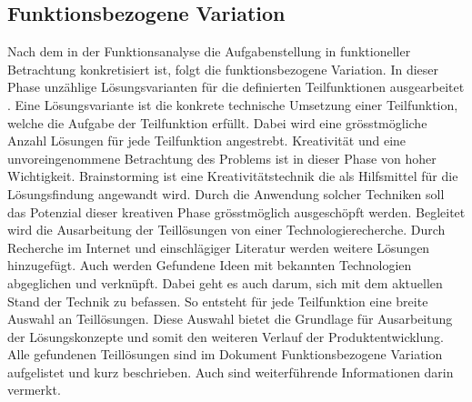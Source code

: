 \subsection{Funktionsbezogene Variation}
Nach dem in der Funktionsanalyse die Aufgabenstellung in funktioneller Betrachtung konkretisiert ist, folgt die funktionsbezogene Variation. In dieser Phase unzählige Lösungsvarianten für die definierten Teilfunktionen ausgearbeitet \cite{pahl}. Eine Lösungsvariante ist die konkrete technische Umsetzung einer Teilfunktion, welche die Aufgabe der Teilfunktion erfüllt. Dabei wird eine grösstmögliche Anzahl Lösungen für jede Teilfunktion angestrebt. 
\newline
Kreativität und eine unvoreingenommene Betrachtung des Problems ist in dieser Phase von hoher Wichtigkeit. Brainstorming ist eine Kreativitätstechnik die als Hilfsmittel für die Lösungsfindung angewandt wird. Durch die Anwendung solcher Techniken soll das Potenzial dieser kreativen Phase grösstmöglich ausgeschöpft werden.
\newline
Begleitet wird die Ausarbeitung der Teillösungen von einer Technologierecherche. Durch Recherche im Internet und einschlägiger Literatur werden weitere Lösungen hinzugefügt. Auch werden Gefundene Ideen mit bekannten Technologien abgeglichen und verknüpft. Dabei geht es auch darum, sich mit dem aktuellen Stand der Technik zu befassen. 
\newline
So entsteht für jede Teilfunktion eine breite Auswahl an Teillösungen. Diese Auswahl bietet die Grundlage für Ausarbeitung der Lösungskonzepte und somit den weiteren Verlauf der Produktentwicklung. Alle gefundenen Teillösungen sind im Dokument Funktionsbezogene Variation aufgelistet und kurz beschrieben. Auch sind weiterführende Informationen darin vermerkt.
